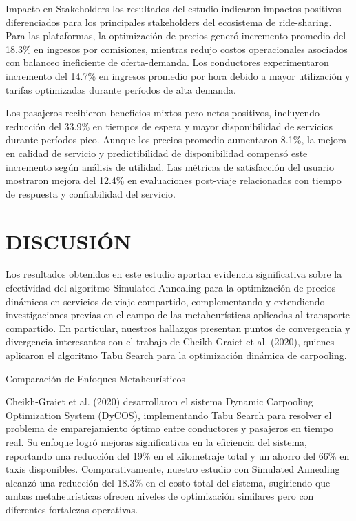 \documentclass[conference]{IEEEtran}
\begin{document}
Impacto en Stakeholders los resultados del estudio indicaron impactos positivos diferenciados para los principales stakeholders del ecosistema de ride-sharing. Para las plataformas, la optimización de precios generó incremento promedio del 18.3\% en ingresos por comisiones, mientras redujo costos operacionales asociados con balanceo ineficiente de oferta-demanda. Los conductores experimentaron incremento del 14.7\% en ingresos promedio por hora debido a mayor utilización y tarifas optimizadas durante períodos de alta demanda.

Los pasajeros recibieron beneficios mixtos pero netos positivos, incluyendo reducción del 33.9\% en tiempos de espera y mayor disponibilidad de servicios durante períodos pico. Aunque los precios promedio aumentaron 8.1\%, la mejora en calidad de servicio y predictibilidad de disponibilidad compensó este incremento según análisis de utilidad. Las métricas de satisfacción del usuario mostraron mejora del 12.4\% en evaluaciones post-viaje relacionadas con tiempo de respuesta y confiabilidad del servicio.

\section{DISCUSIÓN}

Los resultados obtenidos en este estudio aportan evidencia significativa sobre la efectividad del algoritmo Simulated Annealing para la optimización de precios dinámicos en servicios de viaje compartido, complementando y extendiendo investigaciones previas en el campo de las metaheurísticas aplicadas al transporte compartido. En particular, nuestros hallazgos presentan puntos de convergencia y divergencia interesantes con el trabajo de Cheikh-Graiet et al. (2020), quienes aplicaron el algoritmo Tabu Search para la optimización dinámica de carpooling.

Comparación de Enfoques Metaheurísticos

Cheikh-Graiet et al. (2020) desarrollaron el sistema Dynamic Carpooling Optimization System (DyCOS), implementando Tabu Search para resolver el problema de emparejamiento óptimo entre conductores y pasajeros en tiempo real. Su enfoque logró mejoras significativas en la eficiencia del sistema, reportando una reducción del 19\% en el kilometraje total y un ahorro del 66\% en taxis disponibles. Comparativamente, nuestro estudio con Simulated Annealing alcanzó una reducción del 18.3\% en el costo total del sistema, sugiriendo que ambas metaheurísticas ofrecen niveles de optimización similares pero con diferentes fortalezas operativas.
\end{document}
